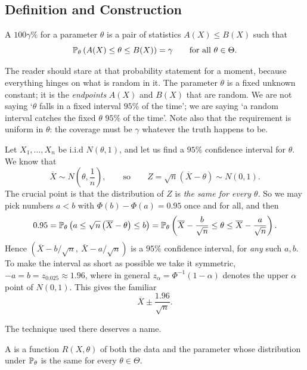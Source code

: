 \documentclass[a4paper]{scrartcl}
\begin{document}
\subsection{Definition and Construction}

\begin{definition}
  A $100\gamma\%$  for a parameter $\theta$ is a pair of statistics $A(X) \leq B(X)$ such that
  $$
  \mathbb{P}_\theta\left(A(X) \leq \theta \leq B(X)\right) = \gamma \qquad \text{for all } \theta \in \Theta.
  $$
\end{definition}

The reader should stare at that probability statement for a moment, because everything hinges on what is random in it. The parameter $\theta$ is a fixed unknown constant; it is the \emph{endpoints} $A(X)$ and $B(X)$ that are random. We are not saying `$\theta$ falls in a fixed interval $95\%$ of the time'; we are saying `a random interval catches the fixed $\theta$ $95\%$ of the time'. Note also that the requirement is uniform in $\theta$: the coverage must be $\gamma$ whatever the truth happens to be.

\begin{example}
  Let $X_1, \dots, X_n$ be i.i.d $N(\theta, 1)$, and let us find a $95\%$ confidence interval for $\theta$. We know that
  $$
  \overline{X} \sim N\left(\theta, \frac{1}{n}\right), \qquad \text{so} \qquad Z = \sqrt{n}\left(\overline{X} - \theta\right) \sim N(0,1).
  $$
  The crucial point is that the distribution of $Z$ is \emph{the same for every $\theta$}. So we may pick numbers $a < b$ with $\Phi(b) - \Phi(a) = 0.95$ once and for all, and then
  $$
  0.95 = \mathbb{P}_\theta\left(a \leq \sqrt{n}\left(\overline{X} - \theta\right) \leq b\right) = \mathbb{P}_\theta\left(\overline{X} - \frac{b}{\sqrt{n}} \leq \theta \leq \overline{X} - \frac{a}{\sqrt{n}}\right).
  $$
  Hence $\left(\overline{X} - b/\sqrt{n},\ \overline{X} - a/\sqrt{n}\right)$ is a $95\%$ confidence interval, for \emph{any} such $a,b$. To make the interval as short as possible we take it symmetric, $-a = b = z_{0.025} \approx 1.96$, where in general $z_\alpha = \Phi^{-1}(1-\alpha)$ denotes the upper $\alpha$ point of $N(0,1)$. This gives the familiar
  $$
  \overline{X} \pm \frac{1.96}{\sqrt{n}}.
  $$
\end{example}

The technique used there deserves a name.

\begin{definition}[Pivot]
  A  is a function $R(X, \theta)$ of both the data and the parameter whose distribution under $\mathbb{P}_\theta$ is the same for every $\theta \in \Theta$.
\end{definition}
\end{document}
